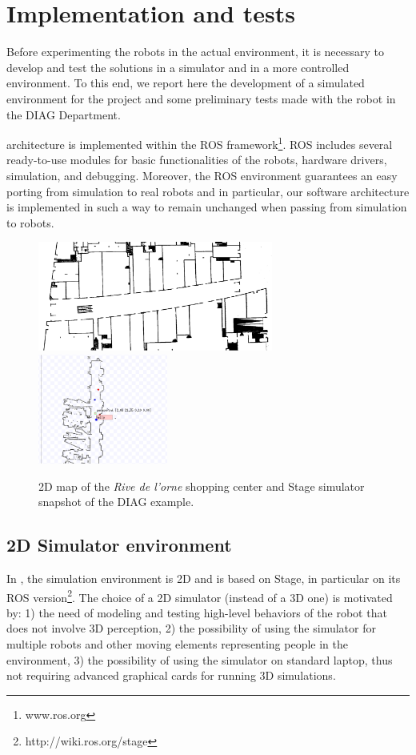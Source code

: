 \section{Implementation and tests}

Before experimenting the robots in the actual environment, it is necessary to develop and test the solutions in a simulator and in a more controlled environment. To this end, we report here the development of a simulated environment for the project and some preliminary tests made with the robot in the DIAG Department.

\coaches architecture is implemented within the ROS framework\footnote{www.ros.org}.
ROS includes several ready-to-use modules for basic functionalities of the robots, hardware drivers, simulation, and debugging.
Moreover, the ROS environment guarantees an easy porting from simulation to real robots and in particular, our software architecture is implemented in such a way to remain unchanged when passing from simulation to robots.

\begin{figure}[t!]
\centering
\includegraphics[height=3.6cm]{fig/Rive1.png}
\includegraphics[height=3.6cm]{fig/stage-demoDIAGPrinter2.png}
\caption{2D map of the \emph{Rive de l'orne} shopping center and Stage simulator snapshot of the DIAG example.}
\label{fig:stage}
\end{figure}

\subsection{2D Simulator environment}

In \coaches, the simulation environment is 2D and is based on Stage, in particular on its ROS version\footnote{http://wiki.ros.org/stage}.
The choice of a 2D simulator (instead of a 3D one) is motivated by: 1) the need of modeling and testing high-level behaviors of the robot that does not involve 3D perception, 2) the possibility of using the simulator for multiple robots and other moving elements representing people in the environment, 3) the possibility of using the simulator on standard laptop, thus not requiring advanced graphical cards for running 3D simulations.

